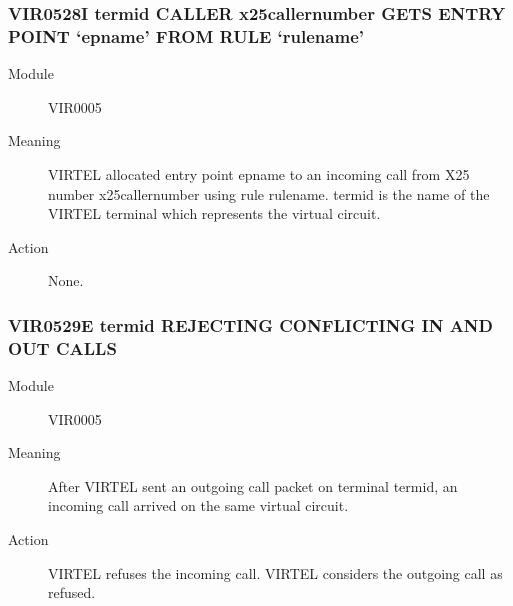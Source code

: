 \documentclass[letterpaper,10pt,english]{sphinxmanual}
\begin{document}
\subsubsection{VIR0528I termid CALLER x25callernumber GETS ENTRY POINT ‘epname’ FROM RULE ‘rulename’}
\label{\detokenize{messages:vir0528i-termid-caller-x25callernumber-gets-entry-point-epname-from-rule-rulename}}\begin{description}
\item[{Module}] \leavevmode
VIR0005

\item[{Meaning}] \leavevmode
VIRTEL allocated entry point epname to an incoming call from X25 number x25callernumber using rule rulename. termid is the name of the VIRTEL terminal which represents the virtual circuit.

\item[{Action}] \leavevmode
None.

\end{description}


\subsubsection{VIR0529E termid REJECTING CONFLICTING IN AND OUT CALLS}
\label{\detokenize{messages:vir0529e-termid-rejecting-conflicting-in-and-out-calls}}\begin{description}
\item[{Module}] \leavevmode
VIR0005

\item[{Meaning}] \leavevmode
After VIRTEL sent an outgoing call packet on terminal termid, an incoming call arrived on the same virtual circuit.

\item[{Action}] \leavevmode
VIRTEL refuses the incoming call. VIRTEL considers the outgoing call as refused.

\end{description}
\end{document}
